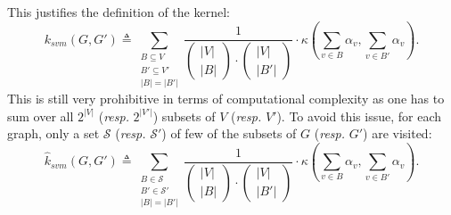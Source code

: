                     This justifies the definition of the kernel:
                    \begin{equation}
                        \label{eq::svm_kernel}
                        k_{svm}(G, G') \triangleq \sum_{\substack{B\subseteq V\\B'\subseteq V'\\\vert B \vert = \vert B' \vert}} \frac{1}{
                            \begin{pmatrix}
                                \vert V \vert\\
                                \vert B \vert                            
                            \end{pmatrix} \cdot \begin{pmatrix}
                                \vert V \vert\\
                                \vert B' \vert                            
                            \end{pmatrix}
                        } \cdot \kappa\left(\sum_{v\in B} \alpha_v, \sum_{v\in B'} \alpha_v\right).
                    \end{equation}
                    This is still very prohibitive in terms of computational complexity as one has to sum over all $2^{\vert V \vert}$ (\textit{resp.} $2^{\vert V' \vert}$) subsets of $V$ (\textit{resp.} $V'$).
                    To avoid this issue, for each graph, only a set \(\mathscr{S}\) (\textit{resp.} \(\mathscr{S}'\)) of few of the subsets of \(G\) (\textit{resp.} \(G'\)) are visited:
                    \begin{equation}
                        \label{eq::svm_approximated_kernel}
                        \hat{k}_{svm}(G, G') \triangleq \sum_{\substack{B\in \mathscr{S}\\B'\in \mathscr{S}'\\\vert B \vert = \vert B' \vert}} \frac{1}{
                            \begin{pmatrix}
                                \vert V \vert\\
                                \vert B \vert                            
                            \end{pmatrix} \cdot \begin{pmatrix}
                                \vert V \vert\\
                                \vert B' \vert                            
                            \end{pmatrix}
                        } \cdot \kappa\left(\sum_{v\in B} \alpha_v, \sum_{v\in B'} \alpha_v\right).
                    \end{equation}

